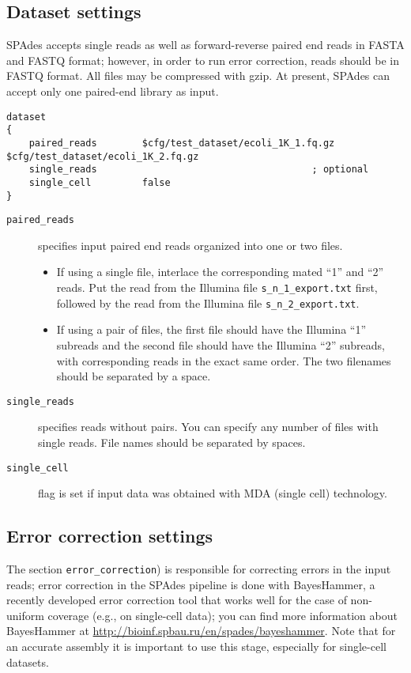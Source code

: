 \documentclass{article}
\def\spades{SPAdes}
\def\bh{BayesHammer}
\begin{document}
\subsection{Dataset settings}
{\spades} accepts single reads as well as forward-reverse paired end reads
in FASTA and FASTQ format; however, in order to run error correction, reads should be in FASTQ format. All files may be compressed with gzip.
At present, {\spades} can accept only one paired-end library as input.

\begin{lstlisting}													
dataset
{
    paired_reads        $cfg/test_dataset/ecoli_1K_1.fq.gz $cfg/test_dataset/ecoli_1K_2.fq.gz
    single_reads                                      ; optional
    single_cell         false
}
\end{lstlisting}

\begin{description}
\item[{\tt paired\_reads}] specifies input paired end reads organized into one or two files.
\begin{itemize}
\item If using a single file, interlace the corresponding mated ``1'' and ``2'' reads. Put the read from the Illumina file {\tt s\_n\_1\_export.txt} first, followed by the read from the Illumina file {\tt s\_n\_2\_export.txt}.
\item If using a pair of files, the first file should have the Illumina ``1'' subreads and the second file should have the Illumina ``2'' subreads, with corresponding reads in the exact same order.  The two filenames should be separated by a space.
\end{itemize}
\item[{\tt single\_reads}] specifies reads without pairs. You can specify any number of
files with single reads. File names should be separated by spaces.
\item[{\tt single\_cell}] flag is set if input data was obtained with MDA (single cell) technology.
\end{description}

\subsection{Error correction settings}
The section {\tt error\_correction}) is responsible for correcting errors in the input reads;
error correction in the {\spades} pipeline is done with {\bh}, a recently developed error correction tool that works well for the case of non-uniform coverage
(e.g., on single-cell data); you can find more information about {\bh} at \url{http://bioinf.spbau.ru/en/spades/bayeshammer}.
Note that for an accurate assembly it is important to use this stage, especially for single-cell datasets.
\end{document}
